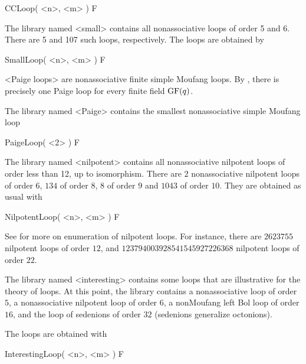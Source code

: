 \>CCLoop( <n>, <m> ) F


The library named <small> contains all nonassociative loops of order 5 and 6.
There are 5 and 107 such loops, respectively. The loops are obtained by

\>SmallLoop( <n>, <m> ) F


<Paige loops> are nonassociative finite
simple Moufang loops. By \cite{Li}, there is precisely one Paige loop for every
finite field ${\rm{GF}}(q)$.

The library named <Paige> contains the smallest nonassociative simple Moufang
loop

\>PaigeLoop( <2> ) F


The library named <nilpotent> contains all nonassociative nilpotent loops of
order less than 12, up to isomorphism. There are $2$ nonassociative nilpotent
loops of order $6$, $134$ of order $8$, $8$ of order $9$ and $1043$ of order
$10$. They are obtained as usual with

\>NilpotentLoop( <n>, <m> ) F

See \cite{DaVo} for more on enumeration of nilpotent loops. For instance, there
are $2623755$ nilpotent loops of order $12$, and $123794003928541545927226368$
nilpotent loops of order $22$.


The library named <interesting> contains some loops that are illustrative for
the theory of loops. At this point, the library contains a nonassociative loop
of order $5$, a nonassociative nilpotent loop of order $6$, a nonMoufang left
Bol loop of order $16$, and the loop of sedenions of order $32$ (sedenions generalize octonions).

The loops are obtained with

\>InterestingLoop( <n>, <m> ) F


